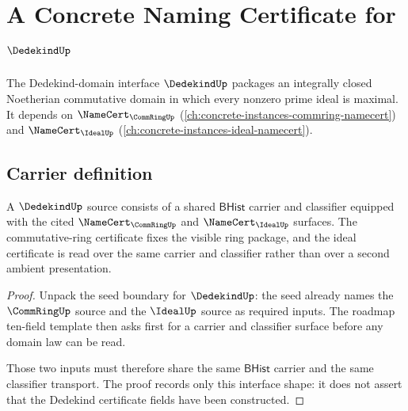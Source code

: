 \chapter{A Concrete Naming Certificate for $\DedekindUp$}
\label{ch:concrete-instances-dedekind-namecert}

The Dedekind-domain interface $\DedekindUp$ packages an integrally closed Noetherian commutative domain in which every nonzero prime ideal is maximal. It depends on $\NameCert_{\CommRingUp}$ (\autoref{ch:concrete-instances-commring-namecert}) and $\NameCert_{\IdealUp}$ (\autoref{ch:concrete-instances-ideal-namecert}).

\section{Carrier definition}
\label{sec:dedekind-carrier}

\begin{theorem}\label{thm:dedekind-source-obligation}
A $\DedekindUp$ source consists of a shared $\mathsf{BHist}$ carrier and classifier equipped with the cited $\NameCert_{\CommRingUp}$ and $\NameCert_{\IdealUp}$ surfaces. The commutative-ring certificate fixes the visible ring package, and the ideal certificate is read over the same carrier and classifier rather than over a second ambient presentation.
\end{theorem}
\begin{proof}
Unpack the seed boundary for $\DedekindUp$: the seed already names the $\CommRingUp$ source and the $\IdealUp$ source as required inputs. The roadmap ten-field template then asks first for a carrier and classifier surface before any domain law can be read.

Those two inputs must therefore share the same $\mathsf{BHist}$ carrier and the same classifier transport. The proof records only this interface shape: it does not assert that the Dedekind certificate fields have been constructed.
\end{proof}

